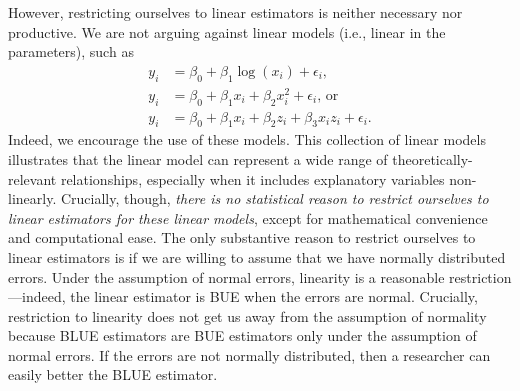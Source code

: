 \documentclass[12pt]{article}
\begin{document}
However, restricting ourselves to linear estimators is neither necessary nor productive. 
We are not arguing against linear models (i.e., linear in the parameters), such as 
\begin{align*}
y_i &= \beta_0 + \beta_1\log(x_i) + \epsilon_i\text{,}\\
y_i &= \beta_0 + \beta_1x_i + \beta_2x_i^2 + \epsilon_i\text{, or}\\ 
y_i &= \beta_0 + \beta_1x_i + \beta_2z_i + \beta_3x_iz_i + \epsilon_i\textit{.}
\end{align*}
Indeed, we encourage the use of these models. This collection of linear models illustrates that the linear model can represent a wide range of theoretically-relevant relationships, especially when it includes explanatory variables non-linearly. 
Crucially, though, \textit{there is no statistical reason to restrict ourselves to linear \textit{estimators} for these linear models}, except for mathematical convenience and computational ease.
The only substantive reason to restrict ourselves to linear estimators is if we are willing to assume that we have normally distributed errors. 
Under the assumption of normal errors, linearity is a reasonable restriction---indeed, the linear estimator is BUE when the errors are normal.
Crucially, restriction to linearity does not get us away from the assumption of normality because BLUE estimators are BUE estimators only under the assumption of normal errors.
If the errors are not normally distributed, then a researcher can easily better the BLUE estimator.
\end{document}
